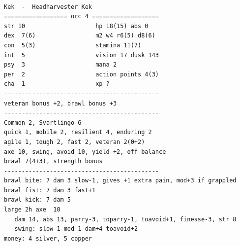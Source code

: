 \


\clearpage
\begin{samepage} \small \begin{verbatim}
Kek  -  Headharvester Kek
================== orc 4 ===================
str 10                    hp 18(15) abs 0
dex  7(6)                 m2 w4 r6(5) d8(6)
con  5(3)                 stamina 11(7)
int  5                    vision 17 dusk 143
psy  3                    mana 2
per  2                    action points 4(3)
cha  1                    xp ?
--------------------------------------------
veteran bonus +2, brawl bonus +3
--------------------------------------------
Common 2, Svartlingo 6
quick 1, mobile 2, resilient 4, enduring 2
agile 1, tough 2, fast 2, veteran 2(0+2)
axe 10, swing, avoid 10, yield +2, off balance
brawl 7(4+3), strength bonus
--------------------------------------------
brawl bite: 7 dam 3 slow-1, gives +1 extra pain, mod+3 if grappled
brawl fist: 7 dam 3 fast+1
brawl kick: 7 dam 5
large 2h axe  10
   dam 14, abs 13, parry-3, toparry-1, toavoid+1, finesse-3, str 8
   swing: slow 1 mod-1 dam+4 toavoid+2
money: 4 silver, 5 copper
\end{verbatim} \normalsize \end{samepage}

\























